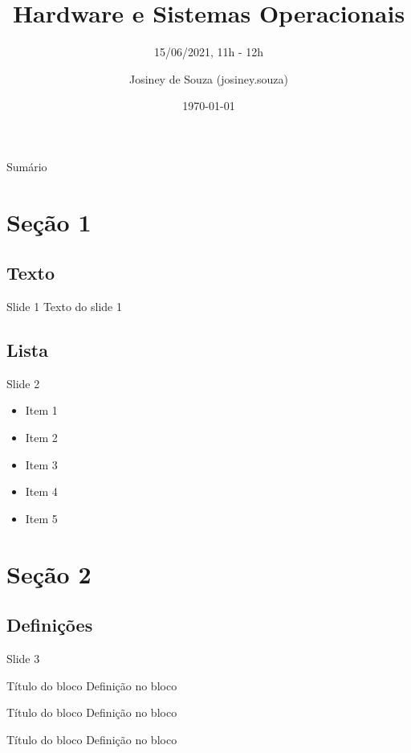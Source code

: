 \documentclass{beamer}
\title{Hardware e Sistemas Operacionais}
\subtitle{15/06/2021, 11h - 12h}
\author{Josiney de Souza (josiney.souza)}
\institute{Instituto Federal Catarinense campus Brusque}
\date{\today}
\begin{document}
\begin{frame}[plain]{}
    \maketitle
\end{frame}

{\small
\begin{frame}[plain]{Sumário}
    \tableofcontents
\end{frame}
}

\section{Seção 1}
\subsection{Texto}
\begin{frame}{Slide 1}
	Texto do slide 1
\end{frame}

\subsection{Lista}
\begin{frame}{Slide 2}
	\begin{itemize}
		\item Item 1
		\item Item 2
		\item Item 3
		\item Item 4
		\item Item 5
	\end{itemize}
\end{frame}

\section{Seção 2}
\subsection{Definições}
\begin{frame}{Slide 3}
	\begin{block}{Título do bloco}
		Definição no bloco
	\end{block}

	\begin{exampleblock}{Título do bloco}
		Definição no bloco
	\end{exampleblock}

	\begin{alertblock}{Título do bloco}
		Definição no bloco
	\end{alertblock}
\end{frame}
\end{document}
